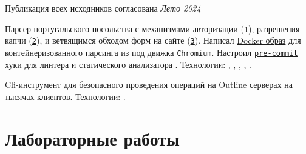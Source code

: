 \documentclass[margin,line]{resume}
\begin{document}
\begin{resume}
\begin{description}
\begin{list2}
        \vspace{2mm}

      \end{list2}
    \item[Другие проекты]\small{
        \begingroup
        \textcolor{gray!40}{Публикация всех исходников согласована}
        \endgroup
      }{\hfill
      \textsl{Лето 2024}}\vspace{2mm}
      \begin{list2}

      \item{
          \href{https://github.com/alchemmist/portu-hack}{Парсер}
          португальского посольства с механизмами авторизации
          (\href{https://github.com/alchemmist/portu-hack/blob/develop/parser/parser/searcher/auth.py}{\texttt{1}}),
          разрешения капчи
          (\href{https://github.com/alchemmist/portu-hack/blob/develop/parser/parser/searcher/captcha.py}{\texttt{2}}),
          и
          ветвящимся обходом форм на сайте
          (\href{https://github.com/alchemmist/portu-hack/blob/develop/parser/parser/searcher/snif.py}{\texttt{3}}).
          Написал
          \href{https://github.com/alchemmist/portu-hack/blob/develop/parser/Dockerfile}{Docker
          образ} для контейнеризованного парсинга
           из под движка \texttt{Chromium}.
          Настроил
          \href{https://github.com/alchemmist/portu-hack/blob/develop/pre-commit-config.yaml}{\texttt{pre-commit}}
          хуки для линтера
           и статического анализатора .
          Технологии: , ,
          ,
          ,
        .}

        \vspace{2mm}

      \item{
          \href{https://github.com/alchemmist/outline-vpn-cli}{Cli-инструмент}
          для безопасного проведения операций на
          Outline серверах на тысячах клиентов.
        Технологии: .}
      \end{list2}

  \end{description}

  \section{\mysidestyle Лабораторные работы}\vspace{2mm}


\end{resume}
\end{document}
